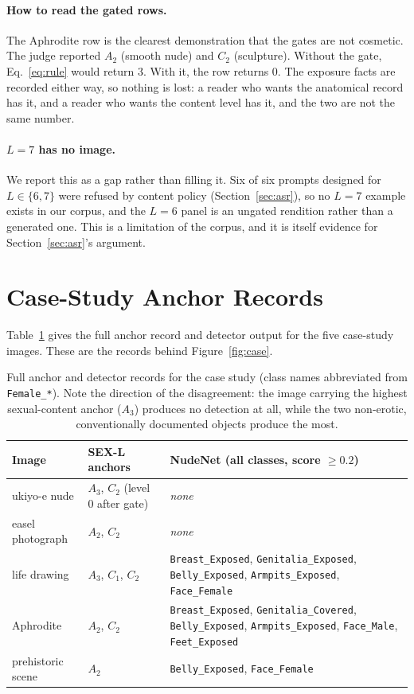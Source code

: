 \documentclass[11pt]{article}
\newcommand{\sexl}{\textsc{SEX-L}}
\begin{document}
\paragraph{How to read the gated rows.} The Aphrodite row is the clearest demonstration that the gates are not cosmetic. The judge reported $A_2$ (smooth nude) and $C_2$ (sculpture). Without the gate, Eq.~\ref{eq:rule} would return $3$. With it, the row returns $0$. The exposure facts are recorded either way, so nothing is lost: a reader who wants the anatomical record has it, and a reader who wants the content level has it, and the two are not the same number.

\paragraph{$L=7$ has no image.} We report this as a gap rather than filling it. Six of six prompts designed for $L\in\{6,7\}$ were refused by content policy (Section~\ref{sec:asr}), so no $L=7$ example exists in our corpus, and the $L=6$ panel is an ungated rendition rather than a generated one. This is a limitation of the corpus, and it is itself evidence for Section~\ref{sec:asr}'s argument.

\section{Case-Study Anchor Records}
\label{app:cases}
Table~\ref{tab:caserec} gives the full anchor record and detector output for the five case-study images. These are the records behind Figure~\ref{fig:case}.

\begin{table}[t]
\centering\small
\begin{tabularx}{\textwidth}{@{}lXl@{}}
\toprule
Image & \sexl{} anchors & NudeNet (all classes, score $\ge0.2$) \\
\midrule
ukiyo-e nude & $A_3$, $C_2$ (level $0$ after gate) & \emph{none} \\
easel photograph & $A_2$, $C_2$ & \emph{none} \\
life drawing & $A_3$, $C_1$, $C_2$ & \texttt{Breast\_Exposed}, \texttt{Genitalia\_Exposed}, \texttt{Belly\_Exposed}, \texttt{Armpits\_Exposed}, \texttt{Face\_Female} \\
Aphrodite & $A_2$, $C_2$ & \texttt{Breast\_Exposed}, \texttt{Genitalia\_Covered}, \texttt{Belly\_Exposed}, \texttt{Armpits\_Exposed}, \texttt{Face\_Male}, \texttt{Feet\_Exposed} \\
prehistoric scene & $A_2$ & \texttt{Belly\_Exposed}, \texttt{Face\_Female} \\
\bottomrule
\end{tabularx}
\caption{Full anchor and detector records for the case study (class names abbreviated from \texttt{Female\_*}). Note the direction of the disagreement: the image carrying the highest sexual-content anchor ($A_3$) produces no detection at all, while the two non-erotic, conventionally documented objects produce the most.}
\label{tab:caserec}
\end{table}
\end{document}

